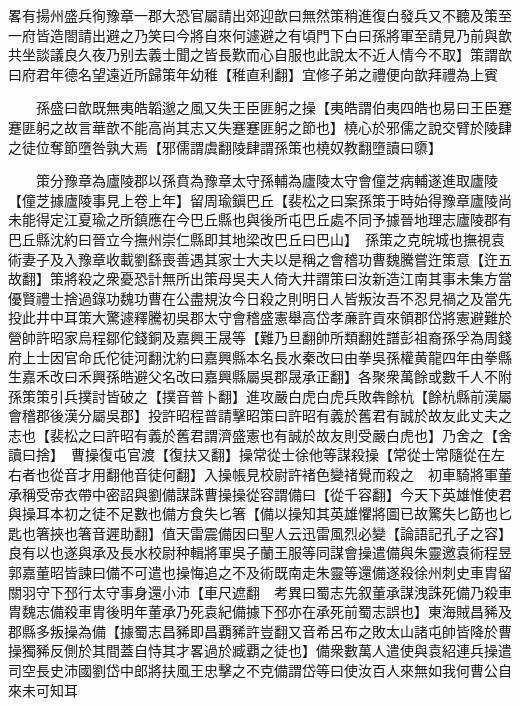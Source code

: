 畧有揚州盛兵徇豫章一郡大恐官屬請出郊迎歆曰無然策稍進復白發兵又不聽及策至一府皆造閤請出避之乃笑曰今將自來何遽避之有頃門下白曰孫將軍至請見乃前與歆共坐談議良久夜乃别去義士聞之皆長歎而心自服也此說太不近人情今不取】策謂歆曰府君年德名望遠近所歸策年幼稚【稚直利翻】宜修子弟之禮便向歆拜禮為上賓

　　孫盛曰歆既無夷皓韜邈之風又失王臣匪躬之操【夷皓謂伯夷四皓也易曰王臣蹇蹇匪躬之故言華歆不能高尚其志又失蹇蹇匪躬之節也】橈心於邪儒之說交臂於陵肆之徒位奪節墮咎孰大焉【邪儒謂虞翻陵肆謂孫策也橈奴教翻墮讀曰隳】

　　策分豫章為廬陵郡以孫賁為豫章太守孫輔為廬陵太守會僮芝病輔遂進取廬陵【僮芝據廬陵事見上卷上年】留周瑜鎭巴丘【裴松之曰案孫策于時始得豫章廬陵尚未能得定江夏瑜之所鎮應在今巴丘縣也與後所屯巴丘處不同予據晉地理志廬陵郡有巴丘縣沈約曰晉立今撫州崇仁縣即其地梁改巴丘曰巴山】　孫策之克皖城也撫視袁術妻子及入豫章收載劉繇喪善遇其家士大夫以是稱之會稽功曹魏騰嘗迕策意【迕五故翻】策將殺之衆憂恐計無所出策母吳夫人倚大井謂策曰汝新造江南其事未集方當優賢禮士捨過錄功魏功曹在公盡規汝今日殺之則明日人皆叛汝吾不忍見禍之及當先投此井中耳策大驚遽釋騰初吳郡太守會稽盛憲舉高岱孝亷許貢來領郡岱將憲避難於營帥許昭家烏程鄒佗錢銅及嘉興王晟等【難乃旦翻帥所類翻姓譜彭祖裔孫孚為周錢府上士因官命氏佗徒河翻沈約曰嘉興縣本名長水秦改曰由拳吳孫權黄龍四年由拳縣生嘉禾改曰禾興孫皓避父名改曰嘉興縣屬吳郡晟承正翻】各聚衆萬餘或數千人不附孫策策引兵撲討皆破之【撲音普卜翻】進攻嚴白虎白虎兵敗犇餘杭【餘杭縣前漢屬會稽郡後漢分屬吳郡】投許昭程普請擊昭策曰許昭有義於舊君有誠於故友此丈夫之志也【裴松之曰許昭有義於舊君謂濟盛憲也有誠於故友則受嚴白虎也】乃舍之【舍讀曰捨】　曹操復屯官渡【復扶又翻】操常從士徐他等謀殺操【常從士常隨從在左右者也從音才用翻他音徒何翻】入操帳見校尉許禇色變禇覺而殺之　初車騎將軍董承稱受帝衣帶中密詔與劉備謀誅曹操操從容謂備曰【從千容翻】今天下英雄惟使君與操耳本初之徒不足數也備方食失匕箸【備以操知其英雄懼將圖已故驚失匕筯也匕匙也箸挾也箸音遲助翻】值天雷震備因曰聖人云迅雷風烈必變【論語記孔子之容】良有以也遂與承及長水校尉种輯將軍吳子蘭王服等同謀會操遣備與朱靈邀袁術程昱郭嘉董昭皆諫曰備不可遣也操悔追之不及術既南走朱靈等還備遂殺徐州刺史車胄留關羽守下邳行太守事身還小沛【車尺遮翻　考異曰蜀志先叙董承謀洩誅死備乃殺車胄魏志備殺車胄後明年董承乃死袁紀備據下邳亦在承死前蜀志誤也】東海賊昌豨及郡縣多叛操為備【據蜀志昌豨即昌覇豨許豈翻又音希呂布之敗太山諸屯帥皆降於曹操獨豨反側於其間蓋自恃其才畧過於臧覇之徒也】備衆數萬人遣使與袁紹連兵操遣司空長史沛國劉岱中郎將扶風王忠擊之不克備謂岱等曰使汝百人來無如我何曹公自來未可知耳

